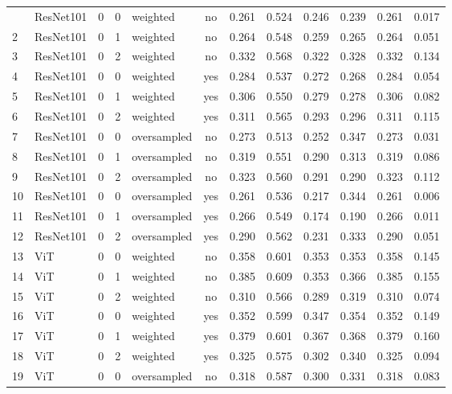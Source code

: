 \documentclass[a4paper,10pt]{book}
\begin{document}
\begin{scriptsize}
\begin{longtable}{@{}l l c c l c c c c c c c@{}}
\bottomrule
\endlastfoot
 1 & ResNet101 & 0 & 0 & weighted & no & 0.261 & 0.524 & 0.246 & 0.239 & 0.261 & 0.017 \\ 
        2 & ResNet101 & 0 & 1 & weighted & no & 0.264 & 0.548 & 0.259 & 0.265 & 0.264 & 0.051 \\ 
        3 & ResNet101 & 0 & 2 & weighted & no & 0.332 & 0.568 & 0.322 & 0.328 & 0.332 & 0.134 \\ 
        4 & ResNet101 & 0 & 0 & weighted & yes & 0.284 & 0.537 & 0.272 & 0.268 & 0.284 & 0.054 \\ 
        5 & ResNet101 & 0 & 1 & weighted & yes & 0.306 & 0.550 & 0.279 & 0.278 & 0.306 & 0.082 \\ 
        6 & ResNet101 & 0 & 2 & weighted & yes & 0.311 & 0.565 & 0.293 & 0.296 & 0.311 & 0.115 \\ 
        7 & ResNet101 & 0 & 0 & oversampled & no & 0.273 & 0.513 & 0.252 & 0.347 & 0.273 & 0.031 \\ 
        8 & ResNet101 & 0 & 1 & oversampled & no & 0.319 & 0.551 & 0.290 & 0.313 & 0.319 & 0.086 \\ 
        9 & ResNet101 & 0 & 2 & oversampled & no & 0.323 & 0.560 & 0.291 & 0.290 & 0.323 & 0.112 \\ 
        10 & ResNet101 & 0 & 0 & oversampled & yes & 0.261 & 0.536 & 0.217 & 0.344 & 0.261 & 0.006 \\ 
        11 & ResNet101 & 0 & 1 & oversampled & yes & 0.266 & 0.549 & 0.174 & 0.190 & 0.266 & 0.011 \\ 
        12 & ResNet101 & 0 & 2 & oversampled & yes & 0.290 & 0.562 & 0.231 & 0.333 & 0.290 & 0.051 \\ 
        13 & ViT & 0 & 0 & weighted & no & 0.358 & 0.601 & 0.353 & 0.353 & 0.358 & 0.145 \\ 
        14 & ViT & 0 & 1 & weighted & no & 0.385 & 0.609 & 0.353 & 0.366 & 0.385 & 0.155 \\ 
        15 & ViT & 0 & 2 & weighted & no & 0.310 & 0.566 & 0.289 & 0.319 & 0.310 & 0.074 \\ 
        16 & ViT & 0 & 0 & weighted & yes & 0.352 & 0.599 & 0.347 & 0.354 & 0.352 & 0.149 \\ 
        17 & ViT & 0 & 1 & weighted & yes & 0.379 & 0.601 & 0.367 & 0.368 & 0.379 & 0.160 \\ 
        18 & ViT & 0 & 2 & weighted & yes & 0.325 & 0.575 & 0.302 & 0.340 & 0.325 & 0.094 \\ 
        19 & ViT & 0 & 0 & oversampled & no & 0.318 & 0.587 & 0.300 & 0.331 & 0.318 & 0.083 \\ 

\end{longtable}
\end{scriptsize}
\end{document}
